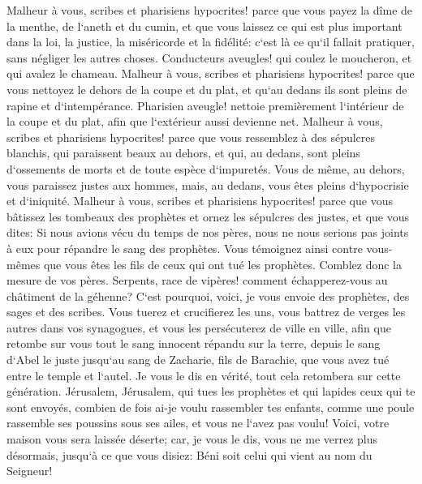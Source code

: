\verse Malheur à vous, scribes et pharisiens hypocrites! parce que vous payez la dîme de la menthe, de l`aneth et du cumin, et que vous laissez ce qui est plus important dans la loi, la justice, la miséricorde et la fidélité: c`est là ce qu`il fallait pratiquer, sans négliger les autres choses. 
\verse Conducteurs aveugles! qui coulez le moucheron, et qui avalez le chameau. 
\verse Malheur à vous, scribes et pharisiens hypocrites! parce que vous nettoyez le dehors de la coupe et du plat, et qu`au dedans ils sont pleins de rapine et d`intempérance. 
\verse Pharisien aveugle! nettoie premièrement l`intérieur de la coupe et du plat, afin que l`extérieur aussi devienne net. 
\verse Malheur à vous, scribes et pharisiens hypocrites! parce que vous ressemblez à des sépulcres blanchis, qui paraissent beaux au dehors, et qui, au dedans, sont pleins d`ossements de morts et de toute espèce d`impuretés. 
\verse Vous de même, au dehors, vous paraissez justes aux hommes, mais, au dedans, vous êtes pleins d`hypocrisie et d`iniquité. 
\verse Malheur à vous, scribes et pharisiens hypocrites! parce que vous bâtissez les tombeaux des prophètes et ornez les sépulcres des justes, 
\verse et que vous dites: Si nous avions vécu du temps de nos pères, nous ne nous serions pas joints à eux pour répandre le sang des prophètes. 
\verse Vous témoignez ainsi contre vous-mêmes que vous êtes les fils de ceux qui ont tué les prophètes. 
\verse Comblez donc la mesure de vos pères. 
\verse Serpents, race de vipères! comment échapperez-vous au châtiment de la géhenne? 
\verse C`est pourquoi, voici, je vous envoie des prophètes, des sages et des scribes. Vous tuerez et crucifierez les uns, vous battrez de verges les autres dans vos synagogues, et vous les persécuterez de ville en ville, 
\verse afin que retombe sur vous tout le sang innocent répandu sur la terre, depuis le sang d`Abel le juste jusqu`au sang de Zacharie, fils de Barachie, que vous avez tué entre le temple et l`autel. 
\verse Je vous le dis en vérité, tout cela retombera sur cette génération. 
\verse Jérusalem, Jérusalem, qui tues les prophètes et qui lapides ceux qui te sont envoyés, combien de fois ai-je voulu rassembler tes enfants, comme une poule rassemble ses poussins sous ses ailes, et vous ne l`avez pas voulu! 
\verse Voici, votre maison vous sera laissée déserte; 
\verse car, je vous le dis, vous ne me verrez plus désormais, jusqu`à ce que vous disiez: Béni soit celui qui vient au nom du Seigneur! 

\chapter{}

